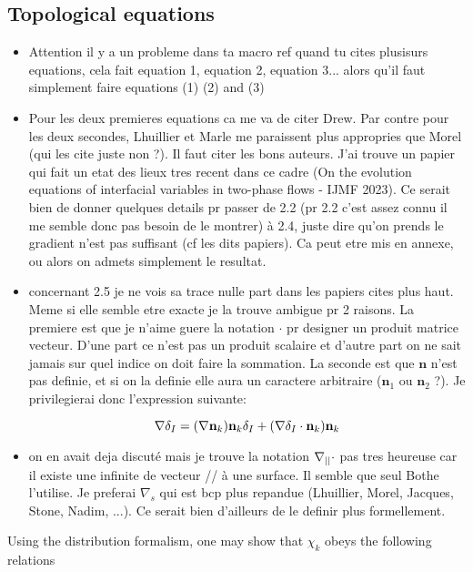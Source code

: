 \subsection{Topological equations}
\color{blue} 
\begin{itemize}
\item Attention il y a un probleme dans ta macro ref quand tu cites plusisurs equations, cela fait equation 1, equation 2, equation 3... alors qu'il faut simplement faire equations (1) (2) and (3)
\item Pour les deux premieres equations ca me va de citer Drew. Par contre pour les deux secondes, Lhuillier et Marle me paraissent plus appropries que Morel (qui les cite juste non ?). Il faut citer les bons auteurs. J'ai trouve un papier qui fait un etat des lieux tres recent dans ce cadre (On the evolution equations of interfacial variables in two-phase flows - IJMF 2023). Ce serait bien de donner quelques details pr passer de 2.2 (pr 2.2 c'est assez connu il me semble donc pas besoin de le montrer) à 2.4, juste dire qu'on prends le gradient n'est pas suffisant (cf les dits papiers). Ca peut etre mis en annexe, ou alors on admets simplement le resultat.
\item concernant 2.5 je ne vois sa trace nulle part dans les papiers cites plus haut. Meme si elle semble etre exacte je la trouve ambigue pr 2 raisons. La premiere est que je n'aime guere la notation $\cdot$ pr designer un produit matrice vecteur. D'une part ce n'est pas un produit scalaire et d'autre part on ne sait jamais sur quel indice on doit faire la sommation. La seconde est que $\mathbf{n}$ n'est pas definie, et si on la definie elle aura un caractere arbitraire ($\mathbf{n}_1$ ou $\mathbf{n}_2$ ?). Je privilegierai donc l'expression suivante:

\begin{equation}
    \mathbf{\nabla}\delta_I 
    = (\mathbf{\nabla} \textbf{n}_k)\textbf{n}_k \delta_I + (\mathbf{\nabla} \delta_I \cdot \textbf{n}_k) \textbf{n}_k \nonumber
\end{equation} 
\item on en avait deja discuté mais je trouve la notation $\mathbf{\nabla}_{||}\cdot$ pas tres heureuse car il existe une infinite de vecteur // à une surface. Il semble que seul Bothe l'utilise. Je preferai $\nabla _s$ qui est bcp plus repandue (Lhuillier, Morel, Jacques, Stone, Nadim, ...). Ce serait bien d'ailleurs de le definir plus formellement.
\end{itemize}
\color{black}
Using the distribution formalism, one may show that $\chi_k$ obeys the following relations \citep{drew1983mathematical} %


